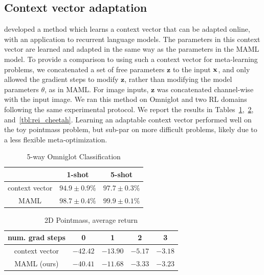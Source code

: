 \documentclass{article}
\begin{document}
\subsection{Context vector adaptation}
\citet{rei} developed a method which learns a context vector that can be adapted online, with an application to recurrent language models. The parameters in this context vector are learned and adapted in the same way as the parameters in the MAML model. To provide a comparison to using such a context vector for meta-learning problems,  we concatenated a set of free parameters $\mathbf{z}$ to the input $\mathbf{x}$, and only allowed the gradient steps to modify $\mathbf{z}$, rather than modifying the model parameters $\theta$, as in MAML. For image inputs, $\mathbf{z}$ was concatenated channel-wise with the input image. We ran this method on Omniglot and two RL domains following the same experimental protocol. We report the results in Tables~\ref{tbl:rei_omniglot},~\ref{tbl:rei_pointmass}, and~\ref{tbl:rei_cheetah}. Learning an adaptable context vector performed well on the toy pointmass problem, but sub-par on more difficult problems, likely due to a less flexible meta-optimization.



\begin{table}
\begin{center}
\caption{5-way Omniglot Classification}
\label{tbl:rei_omniglot}
\begin{tabular}{c|c|c}
\hline
 & 1-shot & 5-shot\\
\hline
context vector & $94.9 \pm 0.9\%$ & $97.7 \pm 0.3\%$ \\
\hline
MAML & $\mathbf{98.7 \pm 0.4\%}$ &  $\mathbf{99.9 \pm 0.1\%}$ \\
\hline
\end{tabular}
\end{center}
\end{table}




\begin{table}
\caption{2D Pointmass, average return}
\label{tbl:rei_pointmass}
\begin{center}
\begin{tabular}{c|c|c|c|c}
\hline
num. grad steps & 0 & 1   & 2 & 3\\
\hline
context vector & $-42.42$ & $-13.90$ & $-5.17$ & $\mathbf{-3.18}$ \\
\hline
MAML (ours) & $-40.41$ & $\mathbf{-11.68}$ & $\mathbf{-3.33}$ & $-3.23$ \\
\hline
\end{tabular}
\end{center}
\end{table}
\end{document}

